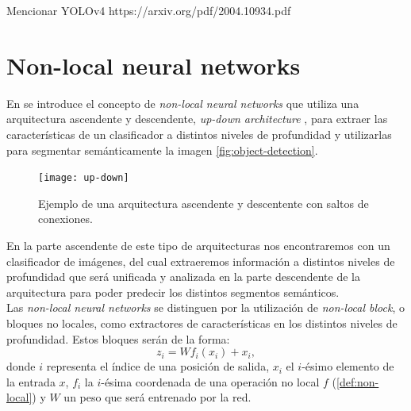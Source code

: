 Mencionar YOLOv4
https://arxiv.org/pdf/2004.10934.pdf\newline

\chapter{Non-local neural networks} \label{def:non-local-block}

En \cite{DBLP:journals/corr/abs-1711-07971} se introduce el concepto de \emph{non-local neural networks} que utiliza una arquitectura ascendente y descendente, \emph{up-down architecture} \cite{2016arXiv160308695P}, para extraer las características de un clasificador a distintos niveles de profundidad y utilizarlas para segmentar semánticamente la imagen \autoref{fig:object-detection}.\newline

\begin{figure}[htpb]
  \centering
  \texttt{[image: up-down]}
  \caption{Ejemplo de una arquitectura ascendente y descentente con saltos de conexiones\cite{2016arXiv160308695P}.}
  \label{fig:up-down}
\end{figure}


En la parte ascendente de este tipo de arquitecturas nos encontraremos con un clasificador de imágenes, del cual extraeremos información a distintos niveles de profundidad que será unificada y analizada en la parte descendente de la arquitectura para poder predecir los distintos segmentos semánticos. \\

Las \emph{non-local neural networks} se distinguen por la utilización de \emph{non-local block}, o bloques no locales, como extractores de características en los distintos niveles de profundidad. Estos bloques serán de la forma: $$z_i=W f_i(x_i) + x_i,$$  donde $i$ representa el índice de una posición de salida, $x_i$ el $i$-ésimo elemento de la entrada $x$, $f_i$ la $i$-ésima coordenada de una operación no local $f$ (\autoref{def:non-local}) y $W$ un peso que será entrenado por la red. \\


